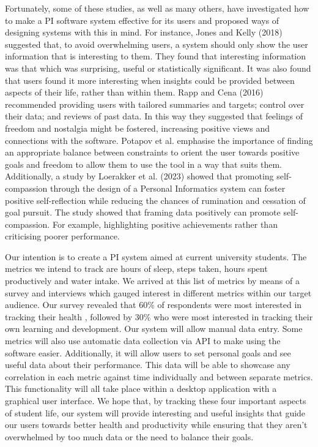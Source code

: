 \documentclass[12pt]{article}
\begin{document}
Fortunately, some of these studies, as well as many others, have investigated how to make a PI software system effective for its users and proposed ways of designing systems with this in mind. For instance, Jones and Kelly (2018) suggested that, to avoid overwhelming users, a system should only show the user information that is interesting to them. They found that interesting information was that which was surprising, useful or statistically significant. It was also found that users found it more interesting when insights could be provided between aspects of their life, rather than within them. Rapp and Cena (2016) recommended providing users with tailored summaries and targets; control over their data; and reviews of past data. In this way they suggested that feelings of freedom and nostalgia might be fostered, increasing positive views and connections with the software. Potapov et al. emphasise the importance of finding an appropriate balance between constraints to orient the user towards positive goals and freedom to allow them to use the tool in a way that suits them. Additionally, a study by Loerakker et al. (2023) showed that promoting self-compassion through the design of a Personal Informatics system can foster positive self-reflection while reducing the chances of rumination and cessation of goal pursuit. The study showed that framing data positively can promote self-compassion. For example, highlighting positive achievements rather than criticising poorer performance.\par

Our intention is to create a PI system aimed at current university students.  The metrics we intend to track are hours of sleep, steps taken, hours spent productively and water intake. We arrived at this list of metrics by means of a survey and interviews which gauged interest in different metrics within our target audience. Our survey revealed that 60\% of respondents were most interested in tracking their health , followed by 30\% who were most interested in tracking their own learning and development. Our system will allow manual data entry. Some metrics will also use automatic data collection via API to make using the software easier. Additionally, it will allow users to set personal goals and see useful data about their performance. This data will be able to showcase any correlation in each metric against time individually and between separate metrics. This functionality will all take place within a desktop application with a graphical user interface. We hope that, by tracking these four important aspects of student life, our system will provide interesting and useful insights that guide our users towards better health and productivity while ensuring that they aren't overwhelmed by too much data or the need to balance their goals.
\end{document}
